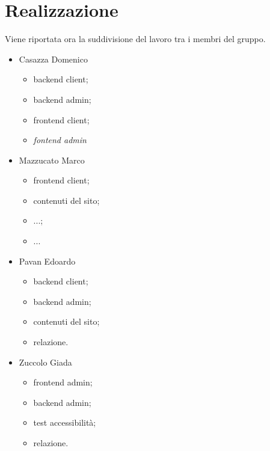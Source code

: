 \section{Realizzazione}
Viene riportata ora la suddivisione del lavoro tra i membri del gruppo.
\begin{itemize}
	\item Casazza Domenico
	\begin{itemize}
		\item backend client;
		\item backend admin;
		\item frontend client;
		\item \textit{fontend admin}
	\end{itemize}
	\item Mazzucato Marco
	\begin{itemize}
		\item frontend client;
		\item contenuti del sito;
		\item ...;
		\item ...
	\end{itemize}	
	\item Pavan Edoardo
	\begin{itemize}
		\item backend client;
		\item backend admin;
		\item contenuti del sito;
		\item relazione.
	\end{itemize}
	\item Zuccolo Giada
	\begin{itemize}
		\item frontend admin;
		\item backend admin;
		\item test accessibilità;
		\item relazione.
	\end{itemize}
\end{itemize}
